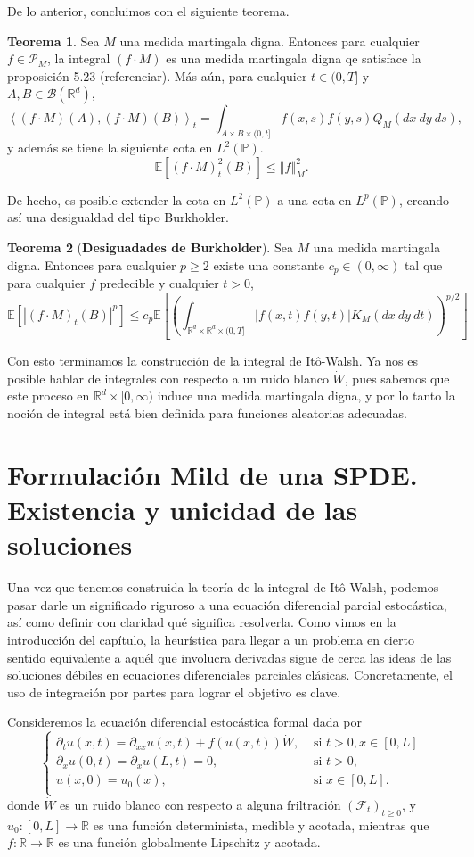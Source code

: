 \documentclass[letterpaper,twoside,12pt]{book}
\newcommand{\R}{\mathbb{R}}
\newcommand{\F}{\mathcal{F}}
\newcommand{\B}{\mathcal{B}}
\newcommand{\E}{\mathbb{E}}
\renewcommand{\P}{\mathbb{P}}
\newcommand{\W}{\dot{W}}
\newcommand{\1}{\mathds{1}}
\newcommand{\abs}[1]{\left\lvert #1 \right\rvert}
\renewcommand{\to}{\rightarrow}
\newcommand{\norm}[1]{\left\Vert #1 \right\Vert}
\theoremstyle{definition}
\theoremstyle{definition}
\newtheorem{teo}{Teorema}
\theoremstyle{definition}
\theoremstyle{definition}
\theoremstyle{definition}
\theoremstyle{definition}
\theoremstyle{definition}
\begin{document}
 De lo anterior, concluimos con el siguiente teorema.

 \begin{teo} 
  Sea $M$ una medida martingala digna. Entonces para cualquier $f\in \mathscr{P}_M$, la integral $(f\cdot M)$ es una medida martingala digna qe satisface la proposición 5.23 (referenciar). Más aún, para cualquier $t\in (0,T]$ y $A,B\in \B(\R^{d})$, 
  \[
  \left\langle (f\cdot M)(A),(f\cdot M)(B)\right\rangle _t= \int_{A\times B\times (0,t]}f(x,s)f(y,s)Q_M(dx \ dy \ ds),
  \]
  y además se tiene la siguiente cota en $L^{2}(\P)$.
  \[
  \E\left[(f\cdot M)^{2}_t(B)\right] \leq \norm{f}_M^{2}.
  \]
  \end{teo}
  De hecho, es posible extender la cota en $L^2(\P)$ a una cota en $L^{p}(\P)$, creando así una desigualdad del tipo Burkholder.
  \begin{teo}[\textbf{Desiguadades de Burkholder}]
   Sea $M$ una medida martingala digna. Entonces para cualquier $p\geq2$ existe una constante $c_p\in (0,\infty)$ tal que para cualquier $f$ predecible y cualquier $t>0$, 
   \[
   \E\left[\abs{(f\cdot M)_t(B)}^p\right]\leq c_p \E\left[\left(\int_{\R^{d}\times \R^{d}\times (0,T]}\abs{f(x,t)f(y,t)}K_M(dx \ dy \ dt)\right)^{p/2}\right] 
   \]
   \end{teo}
   Con esto terminamos la construcción de la integral de Itô-Walsh. Ya nos es posible hablar de integrales con respecto a un ruido blanco $\W$, pues sabemos que este proceso en $\R^{d}\times [0,\infty)$ induce una medida martingala digna, y por lo tanto la noción de integral está bien definida para funciones aleatorias adecuadas. 

\section{Formulación Mild de una SPDE. Existencia y unicidad de las soluciones}
Una vez que tenemos construida la teoría de la integral de Itô-Walsh, podemos pasar darle un significado riguroso a una ecuación diferencial parcial estocástica, así como definir con claridad qué significa resolverla. Como vimos en la introducción del capítulo, la heurística para llegar a un problema en cierto sentido equivalente a aquél que involucra derivadas sigue de cerca las ideas de las soluciones débiles en ecuaciones diferenciales parciales clásicas. Concretamente, el uso de integración por partes para lograr el objetivo es clave. 

Consideremos la ecuación diferencial estocástica formal dada por 
\[
\begin{cases}
    \partial_tu(x,t)=\partial_{xx}u(x,t)+f(u(x,t))\W, & \text{ si } t>0, x\in [0,L]\\
    \partial_xu(0,t)=\partial_xu(L,t)=0, & \text{ si } t>0,\\
    u(x,0)=u_0(x), & \text{ si } x\in [0,L].\\
\end{cases}
\]
donde $\W$ es un ruido blanco con respecto a alguna friltración $(\F_t)_{t\geq0}$, y $u_0:[0,L]\to\R$ es una función determinista, medible y acotada, mientras que $f:\R\to\R$ es una función globalmente Lipschitz y acotada.
\end{document}
